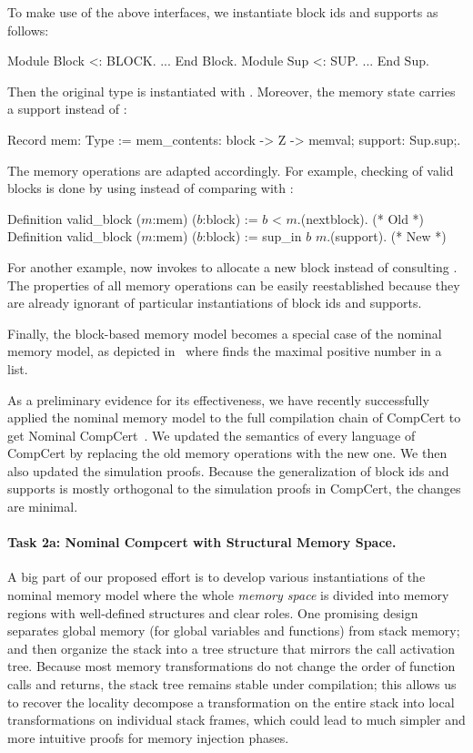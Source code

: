 To make use of the above interfaces, we instantiate block ids and
supports as follows:
%
\begin{coq}
  Module Block <: BLOCK. ... End Block.           Module Sup <: SUP. ... End Sup.
\end{coq}
%
Then the original  type is instantiated with
. Moreover, the memory state carries a support instead of
\nextblock:
%
\begin{coq}
  Record mem: Type := { mem_contents: block -> Z -> memval;   support: Sup.sup;}.
\end{coq}
%
The memory operations are adapted accordingly. For example, checking
of valid blocks is done by using  instead of comparing
with \nextblock:
%
\begin{coq}
  Definition valid_block ($m$:mem) ($b$:block) := $b$ < $m$.(nextblock).   (* Old *)
  Definition valid_block ($m$:mem) ($b$:block) := sup_in $b$ $m$.(support).  (* New *)
\end{coq}
%
For another example,  now invokes  to
allocate a new block instead of consulting \nextblock.
The properties of all memory operations can be easily reestablished
because they are already ignorant of particular instantiations of block ids
and supports. 

Finally, the block-based memory model becomes a special case of the
nominal memory model, as depicted in~ where
 finds the maximal positive number in a list.

As a preliminary evidence for its effectiveness, we have recently
successfully applied the nominal memory model to the full compilation
chain of CompCert to get Nominal CompCert~\cite{wang2022}.  We updated
the semantics of every language of CompCert by replacing the old
memory operations with the new one. We then also updated the
simulation proofs. Because the generalization of block ids and
supports is mostly orthogonal to the simulation proofs in CompCert,
the changes are minimal.

\paragraph*{Task 2a: Nominal Compcert with Structural Memory Space.}
A big part of our proposed effort is to develop various instantiations
of the nominal memory model where the whole {\em memory space} is
divided into memory regions with well-defined structures and clear
roles. One promising design~\cite{wang2022} separates global memory
(for global variables and functions) from stack memory; and then
organize the stack into a tree structure that mirrors the call
activation tree.  Because most memory transformations do not change
the order of function calls and returns, the stack tree remains stable
under compilation; this allows us to recover the locality decompose a
transformation on the entire stack into local transformations on
individual stack frames, which could lead to much simpler and more
intuitive proofs for memory injection phases.

